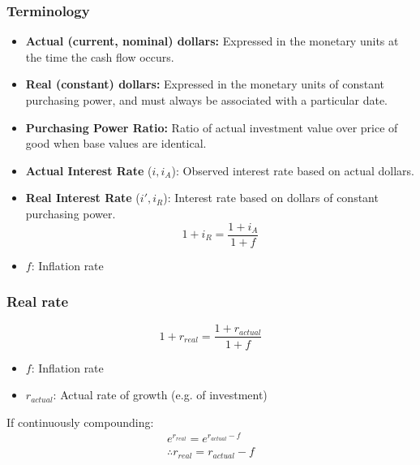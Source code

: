 \subsubsection{Terminology}
\begin{terminology}
    \begin{itemize}
        \item \textbf{Actual (current, nominal) dollars:} Expressed in the monetary units at the time the cash flow occurs.
        \item \textbf{Real (constant) dollars:} Expressed in the monetary units of constant purchasing power, and must always be associated with a particular date.
        \item \textbf{Purchasing Power Ratio:} Ratio of actual investment value over price of good when base values are identical.
        \item \textbf{Actual Interest Rate} (\(i, i_A\)): Observed interest rate based on actual dollars.
        \item \textbf{Real Interest Rate} (\(i', i_R\)): Interest rate based on dollars of constant purchasing power.
        \begin{equation}
            1 + i_R = \frac{1 + i_A}{1 + f}
        \end{equation}
        \item \(f\): Inflation rate
    \end{itemize}
\end{terminology}

\subsubsection{Real rate}
    \begin{definition}
        \begin{equation}
            1 + r_{real} = \frac{1 + r_{actual}}{1 + f}
        \end{equation}
        \begin{itemize}
            \item \(f\): Inflation rate
            \item \(r_{actual}\): Actual rate of growth (e.g. of investment)
        \end{itemize}
        \vspace{1em}

        If continuously compounding: 
        \begin{align}
            e^{r_{real}} = e^{r_{actual} - f} \\
            \therefore r_{real} = r_{actual} - f
        \end{align}
        
    \end{definition}

